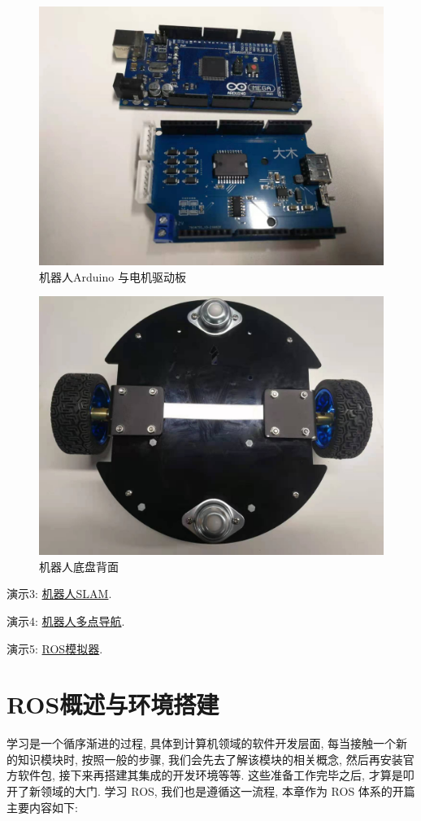 \documentclass[openany, fontset=windowsold]{ctexbook}
\theoremstyle{kaiti}
\theoremstyle{normal}
\begin{document}
\begin{figure}[!ht]
  \centering
  \includegraphics[width=.5\textwidth]{robot_arduino_board.jpg}
  \caption{机器人Arduino 与电机驱动板}
  \label{fig:robot_arduino_board_}
\end{figure}

\begin{figure}[!ht]
  \centering
  \includegraphics[width=.5\textwidth]{robot_chassis_back.jpg}
  \caption{机器人底盘背面}
  \label{fig:robot_chassis_back_}
\end{figure}

演示3: \href{https://www.bilibili.com/video/BV15z4y1672p}{机器人SLAM}.

演示4: \href{https://www.bilibili.com/video/BV1j5411n7Nc}{机器人多点导航}.

演示5: \href{https://www.bilibili.com/video/BV1bx411E7SC}{ROS模拟器}.

\tableofcontents

\listoffigures

\listoftables

\mainmatter

\chapter{ROS概述与环境搭建}

学习是一个循序渐进的过程, 具体到计算机领域的软件开发层面, 每当接触一个新的知识模块时, 按照一般的步骤, 我们会先去了解该模块的相关概念, 然后再安装官方软件包, 接下来再搭建其集成的开发环境等等. 这些准备工作完毕之后, 才算是叩开了新领域的大门. 学习 ROS, 我们也是遵循这一流程, 本章作为 ROS 体系的开篇主要内容如下:
\end{document}
